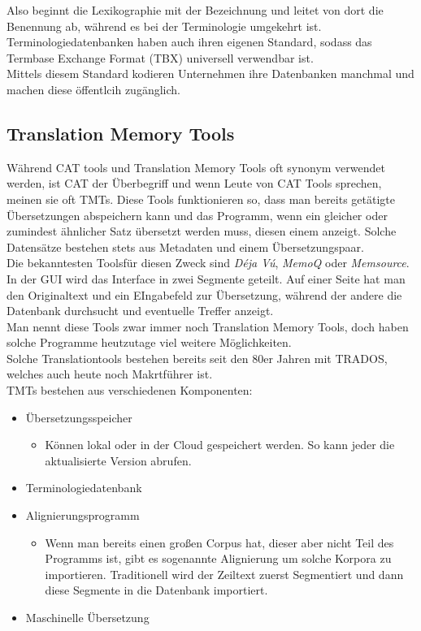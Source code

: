\documentclass{article}
\begin{document}
	Also beginnt die Lexikographie mit der Bezeichnung und leitet von dort die Benennung ab, während es bei der Terminologie umgekehrt ist. \\
	Terminologiedatenbanken haben auch ihren eigenen Standard, sodass das Termbase Exchange Format (TBX) universell verwendbar ist. \\
	Mittels diesem Standard kodieren Unternehmen ihre Datenbanken manchmal und machen diese öffentlcih zugänglich. \\
	\subsection{Translation Memory Tools}
	Während CAT tools und Translation Memory Tools oft synonym verwendet werden, ist CAT der Überbegriff und wenn Leute von CAT Tools sprechen, meinen sie oft TMTs. Diese Tools funktionieren so, dass man bereits getätigte Übersetzungen abspeichern kann und das Programm, wenn ein gleicher oder zumindest ähnlicher Satz übersetzt werden muss, diesen einem anzeigt. Solche Datensätze bestehen stets aus Metadaten und einem Übersetzungspaar. \\
	Die bekanntesten Toolsfür diesen Zweck sind \textit{Déja Vú}, \textit{MemoQ} oder \textit{Memsource}. \\
	In der GUI wird das Interface in zwei Segmente geteilt. Auf einer Seite hat man den Originaltext und ein EIngabefeld zur Übersetzung, während der andere die Datenbank durchsucht und eventuelle Treffer anzeigt. \\
	Man nennt diese Tools zwar immer noch Translation Memory Tools, doch haben solche Programme heutzutage viel weitere Möglichkeiten.\\
	Solche Translationtools bestehen bereits seit den 80er Jahren mit TRADOS, welches auch heute noch Makrtführer ist. \\
	TMTs bestehen aus verschiedenen Komponenten:
	\begin{itemize}
		\item{Übersetzungsspeicher}
		\begin{itemize}
			\item{Können lokal oder in der Cloud gespeichert werden. So kann jeder die aktualisierte Version abrufen.}
		\end{itemize}
		\item{Terminologiedatenbank}
		\item{Alignierungsprogramm}
		\begin{itemize}
			\item{Wenn man bereits einen großen Corpus hat, dieser aber nicht Teil des Programms ist, gibt es sogenannte Alignierung um solche Korpora zu importieren. Traditionell wird der Zeiltext zuerst Segmentiert und dann diese Segmente in die Datenbank importiert.}
		\end{itemize}
		\item{Maschinelle Übersetzung}
	\end{itemize}
\end{document}
